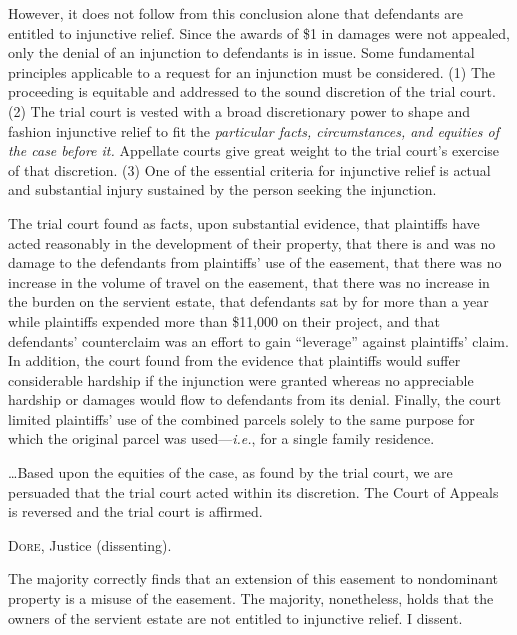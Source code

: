 However, it does not follow from this conclusion alone that defendants are
entitled to injunctive relief. Since the awards of \$1 in damages were not
appealed, only the denial of an injunction to defendants is in issue. Some
fundamental principles applicable to a request for an injunction must be
considered. (1) The proceeding is equitable and addressed to the sound
discretion of the trial court. (2) The trial court is vested with a broad
discretionary power to shape and fashion injunctive relief to fit the
\textit{particular facts, circumstances, and equities of the case before it.}
Appellate courts give great weight to the trial court's exercise of that
discretion. (3) One of the essential criteria for injunctive relief is actual
and substantial injury sustained by the person seeking the injunction.  

The trial court found as facts, upon substantial evidence, that plaintiffs have
acted reasonably in the development of their property, that there is and was no
damage to the defendants from plaintiffs' use of the easement, that there was no
increase in the volume of travel on the easement, that there was no increase in
the burden on the servient estate, that defendants sat by for more than a year
while plaintiffs expended more than \$11,000 on their project, and that
defendants' counterclaim was an effort to gain ``leverage'' against plaintiffs'
claim. In addition, the court found from the evidence that plaintiffs would
suffer considerable hardship if the injunction were granted whereas no
appreciable hardship or damages would flow to defendants from its denial.
Finally, the court limited plaintiffs' use of the combined parcels solely to the
same purpose for which the original parcel was used---\textit{i.e.},  for a
single family residence.

\ldots Based upon the equities of the case, as found by the trial court, we are
persuaded that the trial court acted within its discretion. The Court of Appeals
is reversed and the trial court is affirmed.

\opinion \textsc{Dore}, Justice (dissenting).

The majority correctly finds that an extension of this easement to nondominant
property is a misuse of the easement. The majority, nonetheless, holds that the
owners of the servient estate are not entitled to injunctive relief. I dissent.

